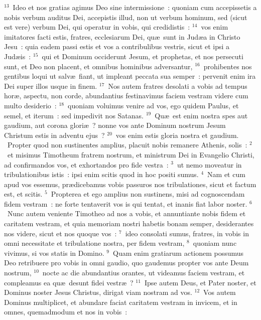 ${}^{13}$~Ideo et nos gratias agimus Deo sine intermissione~: quoniam cum accepissetis a nobis verbum auditus Dei, accepistis illud, non ut verbum hominum, sed (sicut est vere) verbum Dei, qui operatur in vobis, qui credidistis~:
${}^{14}$~vos enim imitatores facti estis, fratres, ecclesiarum Dei, qu\ae\ sunt in Jud\ae a in Christo Jesu~: quia eadem passi estis et vos a contribulibus vestris, sicut et ipsi a Jud\ae is~:
${}^{15}$~qui et Dominum occiderunt Jesum, et prophetas, et nos persecuti sunt, et Deo non placent, et omnibus hominibus adversantur,
${}^{16}$~prohibentes nos gentibus loqui ut salv\ae\ fiant, ut impleant peccata sua semper~: pervenit enim ira Dei super illos usque in finem.
${}^{17}$~Nos autem fratres desolati a vobis ad tempus hor\ae , aspectu, non corde, abundantius festinavimus faciem vestram videre cum multo desiderio~:
${}^{18}$~quoniam voluimus venire ad vos, ego quidem Paulus, et semel, et iterum~: sed impedivit nos Satanas.
${}^{19}$~Qu\ae\ est enim nostra spes aut gaudium, aut corona glori\ae~? nonne vos ante Dominum nostrum Jesum Christum estis in adventu ejus~?
${}^{20}$~vos enim estis gloria nostra et gaudium.
~\lettrine[lines=10,image=true,loversize=0.05,lraise=-0.03]{P}{}ropter quod non sustinentes amplius, placuit nobis remanere Athenis, solis~:
${}^{2}$~et misimus Timotheum fratrem nostrum, et ministrum Dei in Evangelio Christi, ad confirmandos vos, et exhortandos pro fide vestra~:
${}^{3}$~ut nemo moveatur in tribulationibus istis~: ipsi enim scitis quod in hoc positi sumus.
${}^{4}$~Nam et cum apud vos essemus, pr\ae dicebamus vobis passuros nos tribulationes, sicut et factum est, et scitis.
${}^{5}$~Propterea et ego amplius non sustinens, misi ad cognoscendam fidem vestram~: ne forte tentaverit vos is qui tentat, et inanis fiat labor noster.
${}^{6}$~Nunc autem veniente Timotheo ad nos a vobis, et annuntiante nobis fidem et caritatem vestram, et quia memoriam nostri habetis bonam semper, desiderantes nos videre, sicut et nos quoque vos~:
${}^{7}$~ideo consolati sumus, fratres, in vobis in omni necessitate et tribulatione nostra, per fidem vestram,
${}^{8}$~quoniam nunc vivimus, si vos statis in Domino.
${}^{9}$~Quam enim gratiarum actionem possumus Deo retribuere pro vobis in omni gaudio, quo gaudemus propter vos ante Deum nostrum,
${}^{10}$~nocte ac die abundantius orantes, ut videamus faciem vestram, et compleamus ea qu\ae\ desunt fidei vestr\ae~?
${}^{11}$~Ipse autem Deus, et Pater noster, et Dominus noster Jesus Christus, dirigat viam nostram ad vos.
${}^{12}$~Vos autem Dominus multiplicet, et abundare faciat caritatem vestram in invicem, et in omnes, quemadmodum et nos in vobis~:
